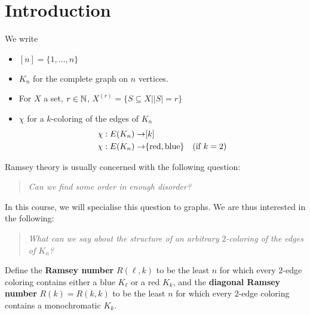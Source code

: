 \documentclass{article}
\begin{document}
\maketitle

\tableofcontents

\clearpage
\section{Introduction}

\newlec

\begin{notation}
  We write
  \begin{itemize}
    \item $[n] = \{1, \dots, n\}$
    \item $K_n$ for the complete graph on $n$ vertices.
    \item For $X$ a set, $r \in \mathbb N$, $X^{(r)} = \{S \subseteq X | |S| = r\}$
    \item $\chi$ for a $k$-coloring of the edges of $K_n$
      \begin{align*}
        \chi : E(K_n) \rightarrow & [k] \\
        \chi : E(K_n) \rightarrow & \{\text{red}, \text{blue}\} & (\text{if } k = 2)
      \end{align*}
  \end{itemize}
\end{notation}

Ramsey theory is usually concerned with the following question:

\begin{quotation}
  \textit{Can we find some order in enough disorder?}
\end{quotation}

In this course, we will specialise this question to graphs. We are thus interested in the following:

\begin{quotation}
  \textit{What can we say about the structure of an arbitrary $2$-coloring of the edges of $K_n$?}
\end{quotation}

\begin{defi}
  Define the {\bf Ramsey number} $R(\ell, k)$ to be the least $n$ for which every $2$-edge coloring contains either a blue $K_\ell$ or a red $K_k$, and the {\bf diagonal Ramsey number} $R(k) = R(k, k)$ to be the least $n$ for which every $2$-edge coloring contains a monochromatic $K_k$.
\end{defi}
\end{document}
